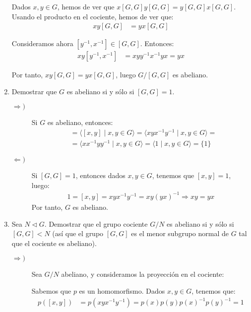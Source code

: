 \begin{ejercicio}
\begin{enumerate}
        Dados $x,y\in G$, hemos de ver que $x[G,G]y[G,G]=y[G,G]x[G,G]$. Usando el producto en el cociente, hemos de ver que:
        \begin{align*}
            xy[G,G] &= yx[G,G]
        \end{align*}

        Consideramos ahora $[y^{-1},x^{-1}]\in [G,G]$. Entonces:
        \begin{align*}
            xy[y^{-1},x^{-1}] &= xyy^{-1}x^{-1}yx = yx
        \end{align*}

        Por tanto, $xy[G,G]=yx[G,G]$, luego $G/[G,G]$ es abeliano.
        \item Demostrar que $G$ es abeliano si y sólo si $[G,G]=1$.
        \begin{description}
            \item[$\Longrightarrow)$] Si $G$ es abeliano, entonces:
            \begin{align*}
                [G,G] &= \langle [x,y]\mid x,y\in G\rangle = \langle xyx^{-1}y^{-1}\mid x,y\in G\rangle =\\&= \langle xx^{-1}yy^{-1}\mid x,y\in G\rangle = \langle 1\mid x,y\in G\rangle = \{1\}
            \end{align*}

            \item[$\Longleftarrow)$] Si $[G,G]=1$, entonces dados $x,y\in G$, tenemos que $[x,y]=1$, luego:
            \begin{align*}
                1=[x,y]=xyx^{-1}y^{-1}=xy(yx)^{-1} \Longrightarrow xy=yx
            \end{align*}
            Por tanto, $G$ es abeliano.
        \end{description}
        \item Sea $N\lhd G$. Demostrar que el grupo cociente $G/N$ es abeliano si y sólo si $[G,G]<N$ (así que el grupo $[G,G]$ es el menor subgrupo normal de $G$ tal que el cociente es abeliano).
        \begin{description}
            \item[$\Longrightarrow)$] Sea $G/N$ abeliano, y consideramos la proyección en el cociente:

            Sabemos que $p$ es un homomorfismo. Dados $x,y\in G$, tenemos que:
            \begin{align*}
                p([x,y]) &= p(xyx^{-1}y^{-1}) = p(x)p(y)p(x)^{-1}p(y)^{-1} = 1
            \end{align*}


\end{description}
\end{enumerate}
\end{ejercicio}
